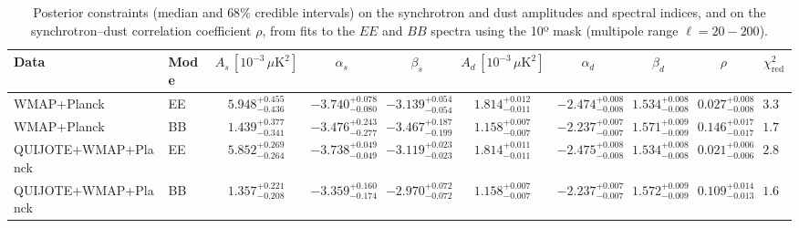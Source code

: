 \begin{table}[h]
\centering
\scriptsize
\setlength{\tabcolsep}{4pt}
\caption{Posterior constraints (median and $68\%$ credible intervals) on the synchrotron and dust amplitudes and spectral indices, and on the synchrotron--dust correlation coefficient $\rho$, from fits to the $EE$ and $BB$ spectra using the 10º mask (multipole range $\ell=20-200$).}
\label{tab:fit_no_QQ_autos_ell20-200}
\begin{tabular}{llcccccccc}
\toprule
Data & Mode & $A_s\,[10^{-3}\,\mu\mathrm{K}^2]$ & $\alpha_s$ & $\beta_s$ & $A_d\,[10^{-3}\,\mu\mathrm{K}^2]$ & $\alpha_d$ & $\beta_d$ & $\rho$ & $\chi^2_\mathrm{red}$ \\
\midrule
WMAP+Planck & EE & $5.948^{+0.455}_{-0.436}$ & $-3.740^{+0.078}_{-0.080}$ & $-3.139^{+0.054}_{-0.054}$ & $1.814^{+0.012}_{-0.011}$ & $-2.474^{+0.008}_{-0.008}$ & $1.534^{+0.008}_{-0.008}$ & $0.027^{+0.008}_{-0.008}$ & $3.32$ \\
WMAP+Planck & BB & $1.439^{+0.377}_{-0.341}$ & $-3.476^{+0.243}_{-0.277}$ & $-3.467^{+0.187}_{-0.199}$ & $1.158^{+0.007}_{-0.007}$ & $-2.237^{+0.007}_{-0.007}$ & $1.571^{+0.009}_{-0.009}$ & $0.146^{+0.017}_{-0.017}$ & $1.78$ \\
QUIJOTE+WMAP+Planck & EE & $5.852^{+0.269}_{-0.264}$ & $-3.738^{+0.049}_{-0.049}$ & $-3.119^{+0.023}_{-0.023}$ & $1.814^{+0.011}_{-0.011}$ & $-2.475^{+0.008}_{-0.008}$ & $1.534^{+0.008}_{-0.008}$ & $0.021^{+0.006}_{-0.006}$ & $2.87$ \\
QUIJOTE+WMAP+Planck & BB & $1.357^{+0.221}_{-0.208}$ & $-3.359^{+0.160}_{-0.174}$ & $-2.970^{+0.072}_{-0.072}$ & $1.158^{+0.007}_{-0.007}$ & $-2.237^{+0.007}_{-0.007}$ & $1.572^{+0.009}_{-0.009}$ & $0.109^{+0.014}_{-0.013}$ & $1.66$ \\
\bottomrule
\end{tabular}
\end{table}